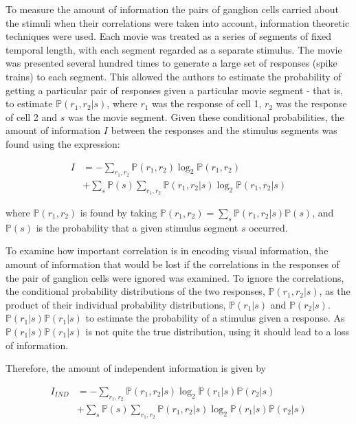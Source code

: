 \documentclass[twoside]{article}
\begin{document}
\begin{multicols}{2}
To measure the amount of information the pairs of ganglion cells carried about the stimuli when their correlations were taken into account, information theoretic techniques were used. Each movie was treated as a series of segments of fixed temporal length, with each segment regarded as a separate stimulus. The movie was presented several hundred times to generate a large set of responses (spike trains) to each segment. This allowed the authors to estimate the probability of getting a particular pair of responses given a particular movie segment - that is, to estimate $\mathbb{P}(r_1,r_2|s)$, where $r_1$ was the response of cell 1, $r_2$ was the response of cell 2 and $s$ was the movie segment. Given these conditional probabilities, the amount of information $I$ between the responses and the stimulus segments was found using the expression:


\begin{align}\label{eq:info-theory}
	I 
		&= -\sum_{r_1,r_2}\mathbb{P}(r_1,r_2)\log_2\mathbb{P}(r_1,r_2) \\
  		&+ \sum_s\mathbb{P}(s) \sum_{r_1,r_2}\mathbb{P}(r_1,r_2|s)\log_2\mathbb{P}(r_1,r_2|s)
\end{align}


where $\mathbb{P}(r_1,r_2)$ is found by taking $\mathbb{P}(r_1,r_2) = \sum_s \mathbb{P}(r_1,r_2|s)\mathbb{P}(s)$, and $\mathbb{P}(s)$ is the probability that a given stimulus segment $s$ occurred. 

To examine how important correlation is in encoding visual information, the amount of information that would be lost if the correlations in the responses of the pair of ganglion cells were ignored was examined. To ignore the correlations, the conditional probability distributions of the two responses, $\mathbb{P}(r_1,r_2|s)$, as the product of their individual probability distributions, $\mathbb{P}(r_1|s)$ and $\mathbb{P}(r_2|s)$. $\mathbb{P}(r_1|s)\mathbb{P}(r_1|s)$ to estimate the probability of a stimulus given a response. As $\mathbb{P}(r_1|s)\mathbb{P}(r_1|s)$ is not quite the true distribution, using it should lead to a loss of information. 

Therefore, the amount of independent information is given by

\begin{align}
	I_{IND} 
		&= -\sum_{r_1,r_2}\mathbb{P}(r_1,r_2|s)\log_2\mathbb{P}(r_1|s)\mathbb{P}(r_2|s) \\
		&+ \sum_s\mathbb{P}(s) \sum_{r_1,r_2}\mathbb{P}(r_1,r_2|s)\log_2\mathbb{P}(r_1|s)\mathbb{P}(r_2|s) 
\end{align}


\end{multicols}
\end{document}
